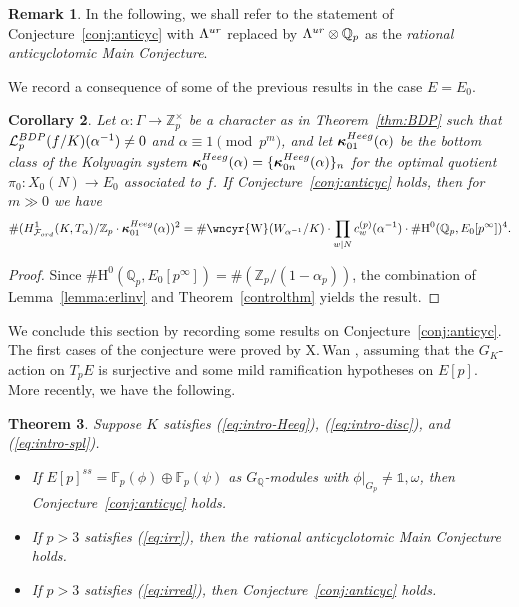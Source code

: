 \documentclass[10pt,reqno]{amsart}
\numberwithin{equation}{section}
\theoremstyle{plain}
\newtheorem{thm}{Theorem}[subsection] %
\theoremstyle{definition}
\newtheorem{rem}[thm]{Remark}
\theoremstyle{definition}
\theoremstyle{plain}
\theoremstyle{plain}
\theoremstyle{plain}
\newtheorem{cor}[thm]{Corollary}
\theoremstyle{plain}
\theoremstyle{plain}
\theoremstyle{plain}
\newcommand{\al}{\alpha} %
\newcommand{\Z}{\mathbb{Z}}
\newcommand{\Q}{\mathbb{Q}}
\newcommand{\bkappa}{\boldsymbol{\kappa}}
\newcommand{\sha}{\text{\wncyr{W}}}
\newcommand{\Lcal}{\mathcal{L}}
\newcommand{\Fcal}{\mathcal{F}}
\newcommand{\rH}{\mathrm{H}}
\begin{document}
\begin{rem}\label{rem:ac-rational}
In the following, we shall refer to the statement of Conjecture~\ref{conj:anticyc} with $\Lambda^{\rm ur}$ replaced by $\Lambda^{\rm ur}\otimes\Q_p$ as the \emph{rational anticyclotomic Main Conjecture}. 
\end{rem}


We record a consequence of some of the previous results in the case $E=E_0$.


\begin{cor}\label{cor:index-sha}
Let $\al:\Gamma\rightarrow\Z_p^\times$ be a character as in %
Theorem~\ref{thm:BDP} such that $\Lcal_p^{\rm BDP}(f/K)(\al^{-1})\neq 0$ and $\alpha\equiv 1\pmod{p^m}$, and let $\bkappa_{01}^{\rm Heeg}(\alpha)$ be the bottom class of the Kolyvagin system $\bkappa^{\rm Heeg}_0(\alpha)=\{\bkappa_{0n}^{\rm Heeg}(\alpha)\}_n$ for the optimal quotient $\pi_0:X_0(N)\rightarrow E_0$ associated to $f$. If Conjecture~\ref{conj:anticyc} holds, then for $m\gg 0$ we have
\[
\#({\rm H}^1_{\Fcal_{\rm ord}}(K,T_{\al})/\Z_p\cdot\bkappa^{\rm Heeg}_{01}(\al))^2 =\#\sha(W_{\al^{-1}}/K)\cdot\prod_{w\mid N}c_w^{(p)}(\al^{-1}) \cdot \#\rH^0(\Q_p,E_0[p^\infty])^4.
\]
\end{cor}

\begin{proof}
Since $\#\rH^0(\Q_p,E_0[p^\infty])=\#(\Z_p/(1-\alpha_p))$, the combination of  Lemma~\ref{lemma:erlinv} and Theorem~\ref{controlthm} yields the result.
\end{proof}

We conclude this section by recording some results on Conjecture~\ref{conj:anticyc}. The first cases of the conjecture were proved by X.\,Wan \cite{wan-heegner}, assuming that the $G_K$-action on $T_pE$ is surjective and some mild ramification hypotheses on $E[p]$. 
More recently, we have the following.

\begin{thm}%
\label{thm:howard-HP}
Suppose $K$ satisfies {\rm (\ref{eq:intro-Heeg})}, {\rm (\ref{eq:intro-disc})}, and {\rm (\ref{eq:intro-spl})}.
\begin{itemize}
\item[(i)] If $E[p]^{ss}=\mathbb{F}_p(\phi)\oplus\mathbb{F}_p(\psi)$ as $G_\Q$-modules with $\phi\vert_{G_p}\neq\mathds{1},\omega$, then Conjecture~\ref{conj:anticyc} holds.
\item[(ii)] If $p>3$ satisfies {\rm (\ref{eq:irr})}, then the rational anticyclotomic Main Conjecture holds. 
\item[(iii)] If $p>3$ satisfies {\rm (\ref{eq:irred})}, then Conjecture~\ref{conj:anticyc} holds.
\end{itemize}
\end{thm}
\end{document}

